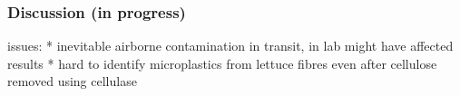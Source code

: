 \documentclass[]{article}
\begin{document}
\hypertarget{discussion-in-progress}{%
\subsubsection{Discussion (in progress)}\label{discussion-in-progress}}

issues: * inevitable airborne contamination in transit, in lab might
have affected results * hard to identify microplastics from lettuce
fibres even after cellulose removed using cellulase
\end{document}
